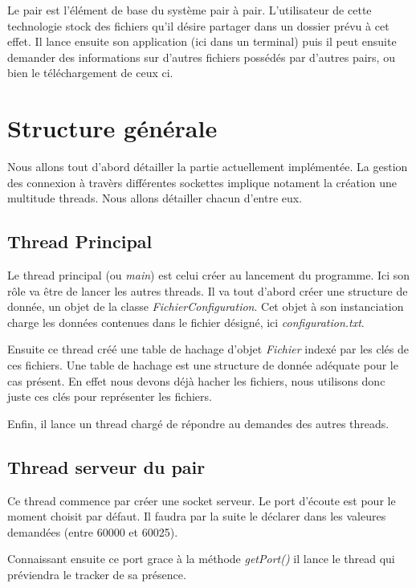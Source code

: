Le pair est l'élément de base du système pair à pair. L'utilisateur de cette technologie stock des fichiers qu'il désire partager dans un dossier prévu à cet effet. Il lance ensuite son application (ici dans un terminal) puis il peut ensuite demander des informations sur d'autres fichiers possédés par d'autres pairs, ou bien le téléchargement de ceux ci.


\section{Structure générale}
Nous allons tout d'abord détailler la partie actuellement implémentée.
La gestion des connexion à travèrs différentes sockettes implique notament la création une multitude threads. Nous allons détailler chacun d'entre eux.



\subsection*{Thread Principal}
Le thread principal (ou \textit{main}) est celui créer au lancement du programme. Ici son rôle va être de lancer les autres threads. 
Il va tout d'abord créer une structure de donnée, un objet de la classe \textit{FichierConfiguration}. Cet objet à son instanciation charge les données contenues dans le fichier désigné, ici \textit{configuration.txt}. 

Ensuite ce thread créé une table de hachage d'objet \textit{Fichier} indexé par les clés de ces fichiers. Une table de hachage est une structure de donnée adéquate pour le cas présent. En effet nous devons déjà hacher les fichiers, nous utilisons donc juste ces clés pour représenter les fichiers. 

Enfin, il lance un thread chargé de répondre au demandes des autres threads.

\subsection*{Thread serveur du pair}
Ce thread commence par créer une socket serveur. Le port d'écoute est pour le moment choisit par défaut. Il faudra par la suite le déclarer dans les valeures demandées (entre 60000 et 60025). 

Connaissant ensuite ce port grace à la méthode \textit{getPort()} il lance le thread qui préviendra le tracker de sa présence.

